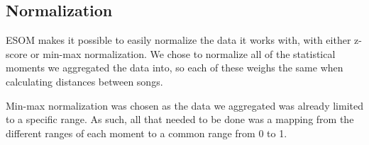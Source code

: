 \subsection{Normalization}
\label{sec:preprocessing_normalization}

ESOM makes it possible to easily normalize the data it works with, with either z-score or min-max normalization.
We chose to normalize all of the statistical moments we aggregated the data into, so each of these weighs
the same when calculating distances between songs.

Min-max normalization was chosen as the data we aggregated was already limited to a specific range. As such, all
that needed to be done was a mapping from the different ranges of each moment to a common range from 0 to 1.